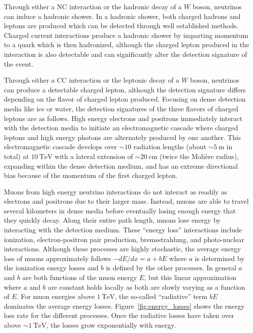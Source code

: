Through either a NC interaction or the hadronic decay of a $W$ boson, neutrinos can induce a hadronic shower.
In a hadronic shower, both charged hadrons and leptons are produced which can be detected through well established methods.
Charged current interactions produce a hadronic shower by imparting momentum to a quark which is then hadronized, although the charged lepton produced in the interaction is also detectable and can significantly alter the detection signature of the event.

Through either a CC interaction or the leptonic decay of a $W$ boson, neutrinos can produce a detectable charged lepton, although the detection signature differs depending on the flavor of charged lepton produced.
Focusing on dense detection media like ice or water, the detection signatures of the three flavors of charged leptons are as follows.
High energy electrons and positrons immediately interact with the detection media to initiate an electromagnetic cascade where charged leptons and high energy photons are alternately produced by one another.
This electromagnetic cascade develops over $\sim10$ radiation lengths (about $\sim\SI{5}\m$ in total) at $\SI{10}\TeV$ with a lateral extension of $\sim\SI{20}\cm$ (twice the Molière radius), expanding within the dense detection medium, and has an extreme directional bias because of the momentum of the first charged lepton.

Muons from high energy neutrino interactions do not interact as readily as electrons and positrons due to their larger mass.
Instead, muons are able to travel several kilometers in dense media before eventually losing enough energy that they quickly decay.
Along their entire path length, muons lose energy by interacting with the detection medium.
These ``energy loss'' interactions include ionization, electron-positron pair production, bremsstrahlung, and photo-nuclear interactions.
Although these processes are highly stochastic, the average energy loss of muons approximately follows $-dE/dx=a+bE$ where $a$ is determined by the ionization energy losses and $b$ is defined by the other processes.
In general $a$ and $b$ are both functions of the muon energy $E$, but this linear approximation where $a$ and $b$ are constant holds locally as both are slowly varying as a function of $E$.
For muon energies above $\SI{1}\TeV$, the so-called ``radiative'' term $bE$ dominates the average energy losses.
Figure~\ref{fig:energy_losses} shows the energy loss rate for the different processes.
Once the radiative losses have taken over above $\sim\SI{1}\TeV$, the losses grow exponentially with energy.


